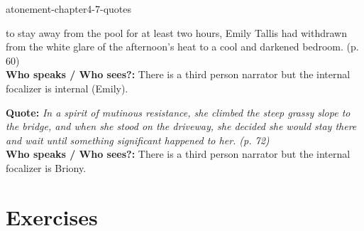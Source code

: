 \documentclass[preview]{standalone}
\begin{document}
\begin{snippet}{atonement-chapter4-7-quotes}
\begin{minipage}[r]{0.95\textwidth}
{        to stay away from the pool for at least two
        hours, Emily Tallis had withdrawn from the
        white glare of the afternoon's heat to a cool
        and darkened bedroom. (p. 60)
    }
    \\
    \textbf{Who speaks / Who sees?:}
    There is a third person narrator but the internal focalizer is
    internal (Emily).
\end{minipage}
\hr
\begin{minipage}[l]{0.05\textwidth}
\end{minipage}
\begin{minipage}[r]{0.95\textwidth}
    \textbf{Quote:} \textit{
        In a spirit of mutinous resistance, she
        climbed the steep grassy slope to the bridge,
        and when she stood on the driveway, she
        decided she would stay there and wait until
        something significant happened to her. (p.
        72)
    }
    \\
    \textbf{Who speaks / Who sees?:}
    There is a third person narrator but the internal focalizer is Briony.
\end{minipage}
\end{snippet}


\section{Exercises}
\end{document}
